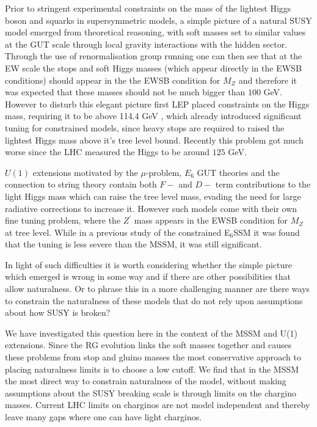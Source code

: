 \documentclass[preprint,amsmath,amssymb,aps,superscriptaddress,prd,showpacs,floatfix,nofootinbib]{revtex4-1}
\begin{document}
Prior to stringent experimental constraints on the mass of the
lightest Higgs boson and squarks in supersymmetric models, a simple
picture of a natural SUSY model emerged from theoretical reasoning,
with soft masses set to similar values at the GUT scale through local
gravity interactions with the hidden sector.  Through the use of
renormalisation group running one can then see that at the EW scale
the stops and soft Higgs masses (which appear directly in the EWSB
conditions) should appear in the the EWSB condition for $M_Z$ and
therefore it was expected that these masses should not be much bigger
than $100$ GeV.  However to disturb this elegant picture first LEP
placed constraints on the Higgs mass, requiring it to be above 114.4
GeV \cite{Barate:2003sz,Schael:2006cr}, which already introduced significant tuning for
constrained models, since heavy stops are required to raised the
lightest Higgs mass above it's tree level bound. Recently this problem
got much worse since the LHC measured the Higgs to be around $125$
GeV.

$U(1)$ extensions motivated by the $\mu$-problem, $E_6$ GUT theories
and the connection to string theory contain both $F-$ and $D-$ term
contributions to the light Higgs mass which can raise the tree level
mass, evading the need for large radiative corrections to increase it.
However such models come with their own fine tuning problem, where the
$Z^\prime$ mass appears in the EWSB condition for $M_Z$ at tree level.
While in a previous study of the constrained E$_6$SSM it was found
that the tuning is less severe than the MSSM, it was still significant.

In light of such difficulties it is worth considering whether the
simple picture which emerged is wrong in some way and if there are
other possibilities that allow naturalness.  Or to phrase this in a
more challenging manner are there ways to constrain the naturalness of
these models that do not rely upon assumptions about how SUSY is
broken?

We have investigated this question here in the context of the MSSM and
U(1) extensions.  Since the RG evolution links the soft masses
together and causes these problems from stop and gluino masses the
most conservative approach to placing naturalness limits is to choose
a low cutoff. We find that in the MSSM the most direct way to
constrain naturalness of the model, without making assumptions about
the SUSY breaking scale is through limits on the chargino
masses. Current LHC limits on charginos are not model independent and
thereby leave many gaps where one can have light charginos.
\end{document}
